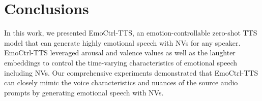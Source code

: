 \section{Conclusions}
\label{sec:conclusions}

In this work, we presented EmoCtrl-TTS, an emotion-controllable zero-shot TTS model 
that can generate highly emotional speech with NVs for any speaker.
EmoCtrl-TTS leveraged arousal and valence values as well as the laughter embeddings to control the time-varying characteristics of emotional speech including NVs. 
Our comprehensive experiments demonstrated that EmoCtrl-TTS can closely mimic the voice characteristics and nuances of the source audio prompts by generating emotional speech with NVs.
